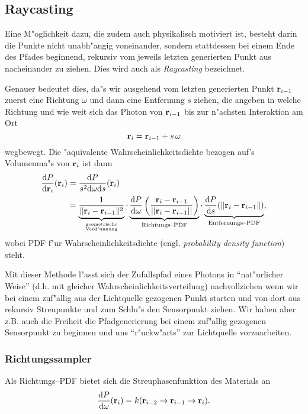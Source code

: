 	\subsection{Raycasting}
	Eine M"oglichkeit dazu, die zudem auch physikalisch motiviert ist, besteht darin die Punkte nicht unabh"angig voneinander, sondern stattdessen bei einem Ende des Pfades beginnend, rekursiv vom jeweils letzten generierten Punkt aus nacheinander zu ziehen. Dies wird auch als {\em Raycasting} bezeichnet.
	
	Genauer bedeutet dies, da"s wir ausgehend vom letzten generierten Punkt $\mathbf{r}_{i-1}$ zuerst eine Richtung $\omega$ und dann eine Entfernung $s$ ziehen, die angeben in welche Richtung und wie weit sich das Photon von $\mathbf{r}_{i-1}$ bis zur n"achsten Interaktion am Ort
	$$\mathbf{r}_i=\mathbf{r}_{i-1}+s\,\omega$$
	wegbewegt.
	Die "aquivalente Wahrscheinlichkeitsdichte bezogen auf's Volumenma"s von $\mathbf{r}_i$ ist dann
	\begin{align*}
		\frac{\text{d}P}{\text{d}\mathbf{r}_i}(\mathbf{r}_i) &= \frac{\text{d}P}{s^2 \text{d}\omega\text{d}s}(\mathbf{r}_i) \\
		&= \underbrace{\frac{1}{\|\mathbf{r}_i - \mathbf{r}_{i-1}\|^2}}_{\text{geometrische}\atop\text{Verd"unnung}} \cdot\underbrace{\frac{\text{d}P}{\text{d}\omega}\left(\frac{\mathbf{r}_i - \mathbf{r}_{i-1}}{||\mathbf{r}_i - \mathbf{r}_{i-1}||}\right)}_{\text{Richtungs--PDF}} \cdot \underbrace{\frac{\text{d}P}{\text{d}s}(\|\mathbf{r}_i-\mathbf{r}_{i-1}\|)}_{\text{Entfernungs--PDF}},
	\end{align*}
	wobei PDF f"ur Wahrscheinlichkeitsdichte (engl. {\em probability density function}) steht.
	
	Mit dieser Methode l"asst sich der Zufallspfad eines Photons in ``nat"urlicher Weise'' (d.h. mit gleicher Wahrscheinlichkeitsverteilung) nachvollziehen wenn wir bei einem zuf"allig aus der Lichtquelle gezogenen Punkt starten und von dort aus rekursiv Streupunkte und zum Schlu"s den Sensorpunkt ziehen. Wir haben aber z.B. auch die Freiheit die Pfadgenerierung bei einem zuf"allig gezogenen Sensorpunkt zu beginnen und uns ``r"uckw"arts'' zur Lichtquelle vorzuarbeiten.
	
	\subsubsection{Richtungssampler}
	Als Richtungs--PDF bietet sich die Streuphasenfunktion des Materials an
	\begin{equation*}
		\frac{\text{d}P}{\text{d}\omega}(\mathbf{r}_i) = k(\mathbf{r}_{i-2}\rightarrow\mathbf{r}_{i-1} \rightarrow\mathbf{r}_i).
		\label{eq:direction_pdf}
	\end{equation*}
	
